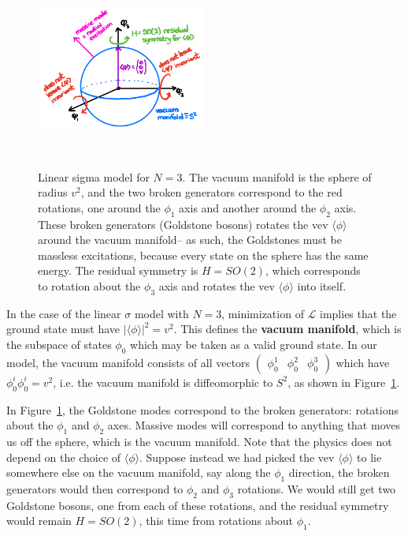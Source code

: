 \documentclass[11pt, oneside]{article}   	%
\theoremstyle{definition}
\numberwithin{equation}{subsection}		%
\begin{document}
\begin{figure}[H]
	\centering
	\includegraphics[width = 0.5\textwidth]{linear_sigma_ssb}
	\caption{Linear sigma model for $N = 3$. The vacuum manifold is the sphere of radius $v^2$, and the two 
	broken generators correspond to the red rotations, one around the $\phi_1$ axis and another around the $\phi_2$ axis. 
	These broken generators (Goldstone bosons) rotates the vev $\langle\phi\rangle$ around the vacuum manifold-- as such, 
	the Goldstones must be massless excitations, because every state on the sphere has the same energy.
	The residual symmetry is $H = SO(2)$, which corresponds to rotation about the $\phi_3$ axis and rotates the vev 
	$\langle\phi\rangle$ into itself.}~
	\label{fig:linear_sigma}
\end{figure}

In the case of the linear $\sigma$ model with $N = 3$, minimization of $\mathcal L$ implies that the ground state must have 
$|\langle\phi\rangle|^2 = v^2$. This defines the \textbf{vacuum manifold}, which is the subspace of states $\phi_0$ which 
may be taken as a valid ground state. In our model, the vacuum manifold consists of all vectors $\begin{pmatrix} \phi_0^1 & 
\phi_0^2 & \phi_0^3 \end{pmatrix}$ which have $\phi_0^i \phi_0^i = v^2$, i.e. the vacuum manifold is diffeomorphic to 
$S^2$, as shown in Figure~\ref{fig:linear_sigma}.

In Figure~\ref{fig:linear_sigma}, the Goldstone modes correspond to the broken generators: rotations about the $\phi_1$ and 
$\phi_2$ axes. Massive modes will correspond to anything that moves us off the sphere, which is the vacuum manifold. 
Note that the physics does not depend on the choice of $\langle\phi\rangle$. Suppose instead we had picked the vev 
$\langle\phi\rangle$ to lie somewhere else on the vacuum manifold, say along the $\phi_1$ direction, the broken generators 
would then correspond to $\phi_2$ and $\phi_3$ rotations. We would still get two Goldstone bosons, one from each of these 
rotations, and the residual symmetry would remain $H = SO(2)$, this time from rotations about $\phi_1$. 
\end{document}
